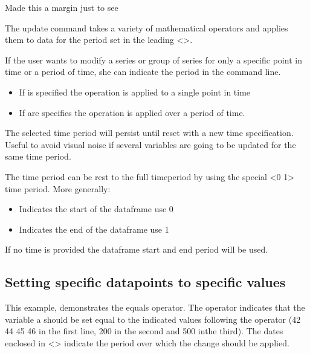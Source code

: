 \documentclass[letterpaper,10pt,english]{jupyterBook}
\begin{document}
\begin{sphinxShadowBox}
\sphinxstylesidebartitle{}

\sphinxAtStartPar
{}

\sphinxAtStartPar
Made this a margin just to see

\sphinxAtStartPar
The update command takes a variety of mathematical operators  and applies them to data for the period set in the leading <>.

\sphinxAtStartPar
If the user wants to modify a series or group of series for only a specific point in time or a period of time, she can indicate the period in the command line.
\begin{itemize}
\item {} 
\sphinxAtStartPar
If  is specified the operation is applied to a single point in time

\item {} 
\sphinxAtStartPar
If   are specifies the operation is applied over a period of time.

\end{itemize}

\sphinxAtStartPar
The selected time period will persist until re\sphinxhyphen{}set with a new time specification. Useful to avoid visual noise if several variables are going to be updated for the same time period.

\sphinxAtStartPar
The time period can be rest to the full time\sphinxhyphen{}period by using the special <\sphinxhyphen{}0 \sphinxhyphen{}1> time period.  More generally:
\begin{itemize}
\item {} 
\sphinxAtStartPar
Indicates the start of the dataframe use \sphinxhyphen{}0

\item {} 
\sphinxAtStartPar
Indicates the end of the dataframe use \sphinxhyphen{}1

\end{itemize}

\sphinxAtStartPar
If no time is provided the dataframe start and end period will be used.
\end{sphinxShadowBox}


\subsection{Setting specific datapoints to specific values}
\label{\detokenize{content/04_PythonEssentials/UpdateCommand:setting-specific-datapoints-to-specific-values}}
\sphinxAtStartPar
This example, demonstrates the equals operator.  The \sphinxcode{\sphinxupquote{=}} operator indicates that the variable a should be set equal to the indicated values following the \sphinxcode{\sphinxupquote{=}} operator (42 44 45 46 in the first line, 200 in the second and 500 inthe third). The dates enclosed in <> indicate the period over which the change should be applied.
\end{document}
